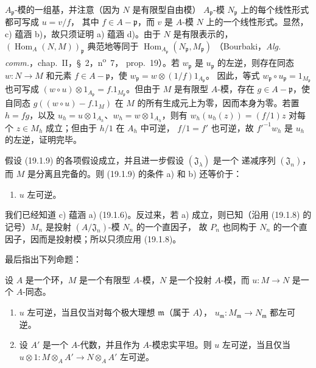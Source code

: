 
$A_{\mathfrak p}$-模的一组基，并注意（因为 $N$ 是有限型自由模）
$A_{\mathfrak p}$-模 $N_{\mathfrak p}$ 上的每个线性形式都可写成 $u=v/f$，
其中 $f\in A-\mathfrak p$，而 $v$ 是 $A$-模 $N$ 上的一个线性形式。显然，
c) 蕴涵 b)，故只须证明 a) 蕴涵 d)。由于 $N$ 是有限表示的，
$(\operatorname{Hom}_A(N,M))_{\mathfrak p}$ 典范地等同于
$\operatorname{Hom}_{A_{\mathfrak p}}(N_{\mathfrak p},M_{\mathfrak p})$
（Bourbaki，\emph{Alg. comm.}，chap.~II，§~2，n\textsuperscript{o}~7，
prop.~19）。若 $w_{\mathfrak p}$ 是 $u_{\mathfrak p}$ 的左逆，则存在同态
$w:N\to M$ 和元素 $f\in A-\mathfrak p$，使
$w_{\mathfrak p}=w\otimes(1/f)1_{A_{\mathfrak p}}$。
因此，等式 $w_{\mathfrak p}\circ u_{\mathfrak p}=1_{M_{\mathfrak p}}$ 也可写成
$(w\circ u)\otimes1_{A_{\mathfrak p}}=f.1_{M_{\mathfrak p}}$。但由于 $M$
是有限型 $A$-模，存在 $g\in A-\mathfrak p$，使自同态
$g((w\circ u)-f.1_M)$ 在 $M$ 的所有生成元上为零，因而本身为零。若置
$h=fg$，以及 $u_h=u\otimes1_{A_h}$、$w_h=w\otimes1_{A_h}$，则有
$w_h(u_h(z))=(f/1)z$ 对每个 $z\in M_h$ 成立；但由于 $h/1$ 在 $A_h$ 中可逆，
$f/1=f'$ 也可逆，故 $f'^{-1}w_h$ 是 $u_h$ 的左逆，证明完毕。

\begin{proposition}[19.1.13]
\label{0.19.1.13-fr}
假设 (19.1.9) 的各项假设成立，并且进一步假设 $(\mathfrak J_\lambda)$ 是一个
递减序列 $(\mathfrak J_n)$，而 $M$ 是分离且完备的。则 (19.1.9) 的条件 a)
和 b) 还等价于：
\begin{enumerate}
  \item[c)] $u$ 左可逆。
\end{enumerate}
\end{proposition}

我们已经知道 c) 蕴涵 a) (19.1.6)。反过来，若 a) 成立，则已知（沿用
(19.1.8) 的记号）$M_n$ 是投射 $(A/\mathfrak J_n)$-模 $N_n$ 的一个直因子，
故 $P_n$ 也同构于 $N_n$ 的一个直因子，因而是投射模；所以只须应用
(19.1.8)。

最后指出下列命题：

\begin{proposition}[19.1.14]
\label{0.19.1.14-fr}
设 $A$ 是一个环，$M$ 是一个有限型 $A$-模，$N$ 是一个投射 $A$-模，而
$u:M\to N$ 是一个 $A$-同态。
\begin{enumerate}
  \item[(i)] $u$ 左可逆，当且仅当对每个极大理想 $\mathfrak m$（属于 $A$），
  $u_{\mathfrak m}:M_{\mathfrak m}\to N_{\mathfrak m}$ 都左可逆。
  \item[(ii)] 设 $A'$ 是一个 $A$-代数，并且作为 $A$-模忠实平坦。则 $u$
  左可逆，当且仅当
  $u\otimes1:M\otimes_AA'\to N\otimes_AA'$ 左可逆。
\end{enumerate}
\end{proposition}

